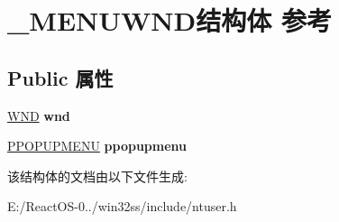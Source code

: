 \hypertarget{struct___m_e_n_u_w_n_d}{}\section{\+\_\+\+M\+E\+N\+U\+W\+N\+D结构体 参考}
\label{struct___m_e_n_u_w_n_d}
\subsection*{Public 属性}
\begin{DoxyCompactItemize}
\item 
\mbox{\label{struct___m_e_n_u_w_n_d_a21c7b5f48060a68e4c921c4a74240928}} 
\hyperlink{struct___w_n_d}{W\+ND} {\bfseries wnd}
\item 
\mbox{\label{struct___m_e_n_u_w_n_d_a63837a4ed70b571df0363d4dffd9ceb8}} 
\hyperlink{structtag_p_o_p_u_p_m_e_n_u}{P\+P\+O\+P\+U\+P\+M\+E\+NU} {\bfseries ppopupmenu}
\end{DoxyCompactItemize}


该结构体的文档由以下文件生成\+:\begin{DoxyCompactItemize}
\item 
E\+:/\+React\+O\+S-\/0../win32ss/include/ntuser.\+h\end{DoxyCompactItemize}
